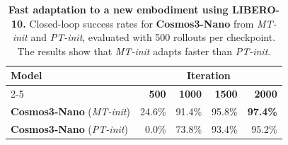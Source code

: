 \begin{table}[t]
    \centering
    \small
    \caption{
        \textbf{Fast adaptation to a new embodiment using LIBERO-10.} Closed-loop success rates for \textbf{Cosmos3-Nano} from \textit{MT-init} and \textit{PT-init}, evaluated with 500 rollouts per checkpoint. The results show that \textit{MT-init} adapts faster than \textit{PT-init}.
    }
    \label{tab:libero_posttraining_success_rate}
    \begin{tabular}{@{}lrrrr@{}}
        \toprule
        \multirow{2}{*}{\textbf{Model}} & \multicolumn{4}{c}{\textbf{Iteration}} \\
        \cmidrule(lr){2-5}
            & \textbf{500} & \textbf{1000} & \textbf{1500} & \textbf{2000} \\
        \midrule
        \textbf{Cosmos3-Nano} (\textit{MT-init}) & 24.6\% & 91.4\% & 95.8\% & \textbf{97.4\%} \\
        \textbf{Cosmos3-Nano} (\textit{PT-init}) & 0.0\% & 73.8\% & 93.4\% & 95.2\% \\
        \bottomrule
    \end{tabular}
\end{table}
